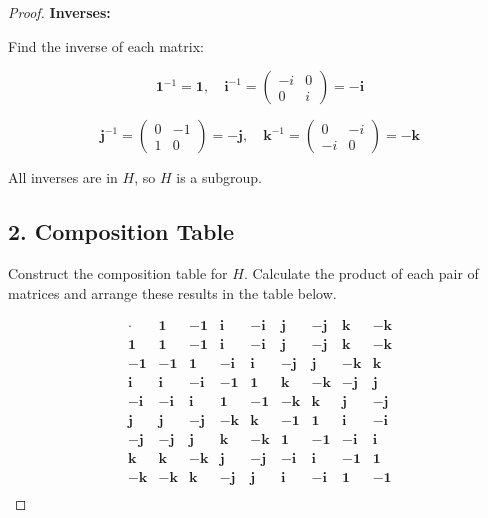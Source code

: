 \documentclass{article}
\begin{document}
\begin{proof}
\textbf{Inverses:}

Find the inverse of each matrix:

\[
\mathbf{1}^{-1} = \mathbf{1}, \quad \mathbf{i}^{-1} = \begin{pmatrix} -i & 0 \\ 0 & i \end{pmatrix} = -\mathbf{i}
\]

\[
\mathbf{j}^{-1} = \begin{pmatrix} 0 & -1 \\ 1 & 0 \end{pmatrix} = -\mathbf{j}, \quad \mathbf{k}^{-1} = \begin{pmatrix} 0 & -i \\ -i & 0 \end{pmatrix} = -\mathbf{k}
\]

All inverses are in \( H \), so \( H \) is a subgroup.

\subsection*{2. Composition Table}

Construct the composition table for \( H \). Calculate the product of each pair of matrices and arrange these results in the table below.

\[
\begin{array}{c|cccccccc}
\cdot & \mathbf{1} & -\mathbf{1} & \mathbf{i} & -\mathbf{i} & \mathbf{j} & -\mathbf{j} & \mathbf{k} & -\mathbf{k} \\
\hline
\mathbf{1} & \mathbf{1} & -\mathbf{1} & \mathbf{i} & -\mathbf{i} & \mathbf{j} & -\mathbf{j} & \mathbf{k} & -\mathbf{k} \\
-\mathbf{1} & -\mathbf{1} & \mathbf{1} & -\mathbf{i} & \mathbf{i} & -\mathbf{j} & \mathbf{j} & -\mathbf{k} & \mathbf{k} \\
\mathbf{i} & \mathbf{i} & -\mathbf{i} & -\mathbf{1} & \mathbf{1} & \mathbf{k} & -\mathbf{k} & -\mathbf{j} & \mathbf{j} \\
-\mathbf{i} & -\mathbf{i} & \mathbf{i} & \mathbf{1} & -\mathbf{1} & -\mathbf{k} & \mathbf{k} & \mathbf{j} & -\mathbf{j} \\
\mathbf{j} & \mathbf{j} & -\mathbf{j} & -\mathbf{k} & \mathbf{k} & -\mathbf{1} & \mathbf{1} & \mathbf{i} & -\mathbf{i} \\
-\mathbf{j} & -\mathbf{j} & \mathbf{j} & \mathbf{k} & -\mathbf{k} & \mathbf{1} & -\mathbf{1} & -\mathbf{i} & \mathbf{i} \\
\mathbf{k} & \mathbf{k} & -\mathbf{k} & \mathbf{j} & -\mathbf{j} & -\mathbf{i} & \mathbf{i} & -\mathbf{1} & \mathbf{1} \\
-\mathbf{k} & -\mathbf{k} & \mathbf{k} & -\mathbf{j} & \mathbf{j} & \mathbf{i} & -\mathbf{i} & \mathbf{1} & -\mathbf{1} \\
\end{array}
\]

\end{proof}
\end{document}
